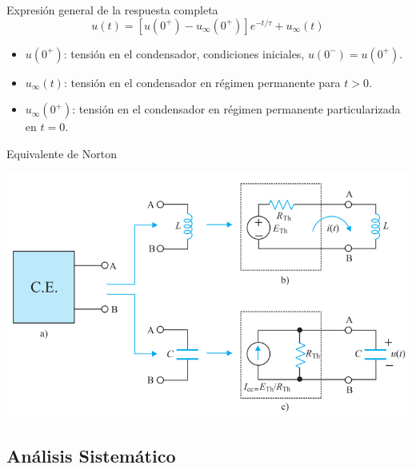 \documentclass[aspectratio=169, usenames,svgnames,dvipsnames]{beamer}
\begin{document}
\begin{frame}[label={sec:orgdc385de}]{Expresión general de la respuesta completa}
\[
\boxed{u(t) = \left[u(0^+) - u_\infty(0^+)\right] e^{-t/\tau} + u_\infty(t)}
\]

\begin{itemize}
\item \(u(0^+)\): tensión en el condensador, condiciones iniciales, \(u(0^-) = u(0^+)\).
\item \(u_\infty(t)\): tensión en el condensador en régimen permanente para \(t > 0\).
\item \(u_\infty(0^+)\): tensión en el condensador en régimen permanente particularizada en \(t = 0\).
\end{itemize}
\end{frame}
\begin{frame}[label={sec:org12a3f7b}]{Equivalente de Norton}
\begin{center}
\includegraphics[height=0.85\textheight]{../figs/Thevenin_PrimerOrden.pdf}
\end{center}
\end{frame}
\subsection{Análisis Sistemático}
\label{sec:orgdc5ca84}
\end{document}
